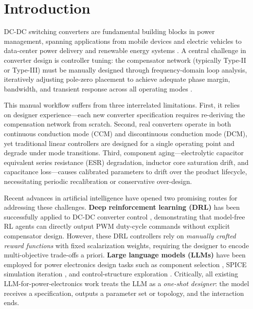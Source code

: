 \documentclass[11pt,a4paper]{article}
\begin{document}
\section{Introduction}

DC-DC switching converters are fundamental building blocks in power management,
spanning applications from mobile devices and electric vehicles to data-center
power delivery and renewable energy systems \cite{erickson2001fundamentals}.
A central challenge in converter design is controller tuning: the compensator
network (typically Type-II or Type-III) must be manually designed through
frequency-domain loop analysis, iteratively adjusting pole-zero placement to
achieve adequate phase margin, bandwidth, and transient response across all
operating modes \cite{maksimovic2001fundamentals}.

This manual workflow suffers from three interrelated limitations.
First, it relies on designer experience---each new converter specification
requires re-deriving the compensation network from scratch.
Second, real converters operate in both continuous conduction mode (CCM) and
discontinuous conduction mode (DCM), yet traditional linear controllers are
designed for a single operating point and degrade under mode transitions.
Third, component aging---electrolytic capacitor equivalent series resistance
(ESR) degradation, inductor core saturation drift, and capacitance loss---causes
calibrated parameters to drift over the product lifecycle, necessitating
periodic recalibration or conservative over-design.

Recent advances in artificial intelligence have opened two promising routes for
addressing these challenges.
\textbf{Deep reinforcement learning (DRL)} has been successfully applied to
DC-DC converter control \cite{ye2024td3,ye2024ddpg,liu2025event}, demonstrating
that model-free RL agents can directly output PWM duty-cycle commands without
explicit compensator design.
However, these DRL controllers rely on \textit{manually crafted reward functions}
with fixed scalarization weights, requiring the designer to encode multi-objective
trade-offs a priori.
\textbf{Large language models (LLMs)} have been employed for power electronics
design tasks such as component selection \cite{lin2025pegpt}, SPICE simulation
iteration \cite{nau2025spiceassistant}, and control-structure exploration
\cite{cui2025gencontrol}.
Critically, all existing LLM-for-power-electronics work treats the LLM as a
\textit{one-shot designer}: the model receives a specification, outputs a
parameter set or topology, and the interaction ends.
\end{document}
